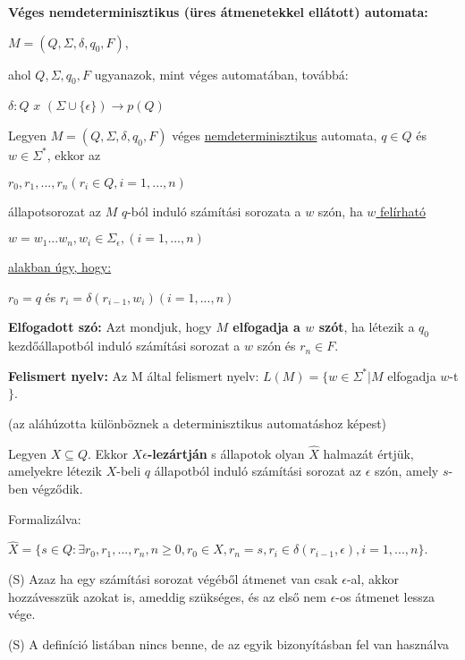 \documentclass[10pt]{article}
\renewcommand{\\}{\par\noindent}
\begin{document}
\begin{frame}
\begin{tcolorbox}[title={Def.: Nemdeterminisztikus automata}]
\textbf{Véges nemdeterminisztikus (üres átmenetekkel ellátott) automata:}\\
\medskip
$M = (Q, {\Sigma}, {\delta}, q_0, F)$,\\
\medskip
ahol $Q, {\Sigma}, q_0, F$ ugyanazok, mint véges automatában, továbbá:\\
\medskip
$\delta : Q$ $x$ $({\Sigma} \cup \{{\epsilon}\}) \rightarrow p(Q)$
\end{tcolorbox}

\begin{tcolorbox}[title={squeezed Def.: Számítási sorozat, elfogadott szó, felismert nyelv}]
Legyen $M = (Q, {\Sigma}, {\delta}, q_0, F)$ véges \underline{nemdeterminisztikus} automata, $q \in Q$ és \underline{$w \in {\Sigma}^*$}, ekkor az\\
\medskip
$r_0, r_1, ..., r_n (r_i \in Q, i = 1, ..., n)$\\
\medskip
állapotsorozat az $M$ $q$-ból induló számítási sorozata a $w$ szón, ha \underline{$w$ felírható}\\
\medskip
\underline{$w = w_1 ... w_n, w_i \in {\Sigma}_{\epsilon}, (i = 1, ..., n)$}\\
\medskip
\underline{alakban úgy, hogy:}\\
\medskip
$r_0 = q$ és $r_i = {\delta}(r_{i - 1}, w_i)(i = 1, ..., n)$\\
\bigskip
\textbf{Elfogadott szó:} Azt mondjuk, hogy \textbf{$M$ elfogadja a $w$ szót}, ha létezik a $q_0$ kezdőállapotból induló számítási sorozat a $w$ szón és $r_n \in F$.\\
\bigskip
\textbf{Felismert nyelv:} Az M által felismert nyelv: $L(M) = \{w \in {\Sigma}^* | M$ elfogadja $w$-t$\}$.\\
\bigskip
(az aláhúzotta különböznek a determinisztikus automatáshoz képest)
\end{tcolorbox}

\begin{tcolorbox}[title={Def.: $X \epsilon$-lezártja}]
Legyen $X \subseteq Q$. Ekkor \textbf{$X \epsilon$-lezártján} s állapotok olyan $\widehat{X}$ halmazát értjük, amelyekre létezik $X$-beli $q$ állapotból induló számítási sorozat az $\epsilon$ szón, amely $s$-ben végződik.\\
Formalizálva:\\
$\widehat{X} = \{s \in Q : {\exists}r_0,r_1,...,r_n, n \geq 0, r_0 \in X, r_n = s, r_i \in {\delta}(r_{i - 1}, {\epsilon}), i = 1, ..., n\}$.\\
{\tiny (S) Azaz ha egy számítási sorozat végéből átmenet van csak $\epsilon$-al, akkor hozzávesszük azokat is, ameddig szükséges, és az első nem $\epsilon$-os átmenet lessza vége.}\\
{\tiny (S) A definíció listában nincs benne, de az egyik bizonyításban fel van használva}
\end{tcolorbox}
\end{frame}
\end{document}
